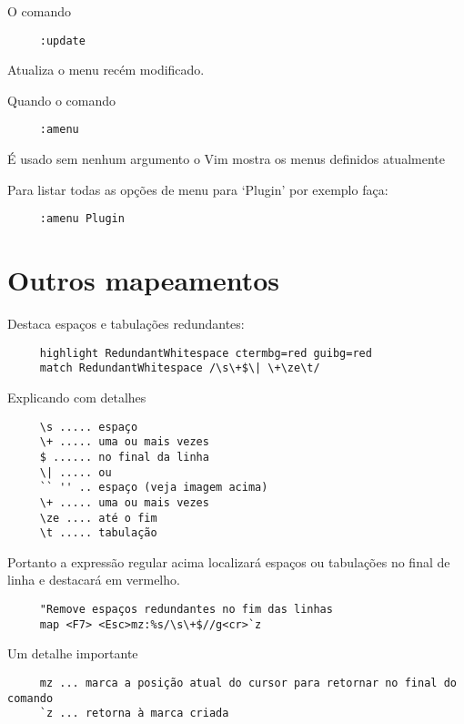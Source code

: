 O comando

\begin{verbatim}
     :update
\end{verbatim}

Atualiza o menu recém modificado.

Quando o comando

\begin{verbatim}
     :amenu
\end{verbatim}

É usado sem nenhum argumento o Vim mostra os menus definidos atualmente

Para listar todas as opções de menu para `Plugin' por exemplo faça:

\begin{verbatim}
     :amenu Plugin
\end{verbatim}

\section{Outros mapeamentos}
\label{Outros mapeamentos}

Destaca espaços e tabulações redundantes:

\begin{verbatim}
     highlight RedundantWhitespace ctermbg=red guibg=red
     match RedundantWhitespace /\s\+$\| \+\ze\t/
\end{verbatim}

Explicando com detalhes

\begin{verbatim}
     \s ..... espaço
     \+ ..... uma ou mais vezes
     $ ...... no final da linha
     \| ..... ou
     `` '' .. espaço (veja imagem acima)
     \+ ..... uma ou mais vezes
     \ze .... até o fim
     \t ..... tabulação
\end{verbatim}

Portanto a expressão regular acima localizará espaços ou tabulações no final de linha
e destacará em vermelho.


\begin{verbatim}
     "Remove espaços redundantes no fim das linhas
     map <F7> <Esc>mz:%s/\s\+$//g<cr>`z
\end{verbatim}

Um detalhe importante

\begin{verbatim}
     mz ... marca a posição atual do cursor para retornar no final do comando
     `z ... retorna à marca criada
\end{verbatim}

